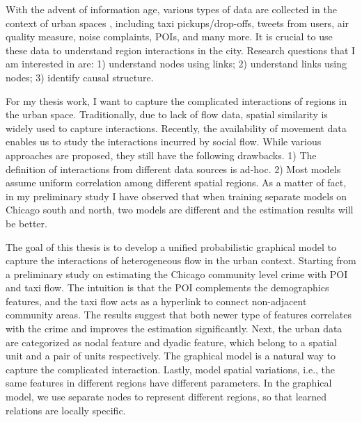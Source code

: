 With the advent of information age, various types of data are collected in the context of urban spaces , including taxi pickups/drop-offs, tweets from users, air quality measure, noise complaints, POIs, and many more. It is crucial to use these data to understand region interactions in the city. Research questions that I am interested in are: 1) understand nodes using links; 2) understand links using nodes; 3) identify causal structure.

For my thesis work, I want to capture the complicated interactions of regions in the urban space. Traditionally, due to lack of flow data, spatial similarity is widely used to capture interactions. Recently, the availability of movement data enables us to study the interactions incurred by social flow.  While various approaches are proposed, they still have the following drawbacks. 1) The definition of interactions from different data sources is ad-hoc. 2) Most models assume uniform correlation among different spatial regions. As a matter of fact, in my preliminary study I have observed that when training separate models on Chicago south and north, two models are different and the estimation results will be better.

The goal of this thesis is to develop a unified probabilistic graphical model to capture the interactions of heterogeneous flow in the urban context. Starting from a preliminary study on estimating the Chicago community level crime with POI and taxi flow. The intuition is that the POI complements the demographics features, and the taxi flow acts as a hyperlink to connect non-adjacent community areas. The results suggest that both newer type of features correlates with the crime and improves the estimation significantly. Next, the urban data are categorized as nodal feature and dyadic feature, which belong to a spatial unit and a pair of units respectively. The graphical model is a natural way to capture the complicated interaction.
Lastly, model spatial variations, i.e., the same features in different regions have different parameters. In the graphical model, we use separate nodes to represent different regions, so that learned relations are locally specific.




